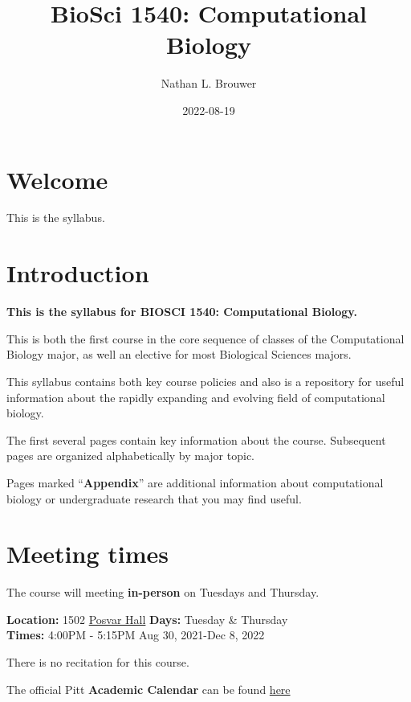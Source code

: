 \documentclass[
]{book}
\title{BioSci 1540: Computational Biology}
\author{Nathan L. Brouwer}
\date{2022-08-19}
\begin{document}
\maketitle

{
\setcounter{tocdepth}{1}
\tableofcontents
}
\hypertarget{welcome}{%
\chapter{Welcome}\label{welcome}}

This is the syllabus.

\hypertarget{intro}{%
\chapter{Introduction}\label{intro}}

\textbf{This is the syllabus for BIOSCI 1540: Computational Biology.}

This is both the first course in the core sequence of classes of the Computational Biology major, as well an elective for most Biological Sciences majors.

This syllabus contains both key course policies and also is a repository for useful information about the rapidly expanding and evolving field of computational biology.

The first several pages contain key information about the course. Subsequent pages are organized alphabetically by major topic.

Pages marked ``\textbf{Appendix}'' are additional information about computational biology or undergraduate research that you may find useful.

\hypertarget{meeting-times}{%
\chapter{Meeting times}\label{meeting-times}}

The course will meeting \textbf{in-person} on Tuesdays and Thursday.

\textbf{Location:} 1502 \href{https://www.tour.pitt.edu/tour/wesley-w-posvar-hall}{Posvar Hall}
\textbf{Days:} Tuesday \& Thursday\\
\textbf{Times:} 4:00PM - 5:15PM
Aug 30, 2021-Dec 8, 2022

There is no recitation for this course.

The official Pitt \textbf{Academic Calendar} can be found \href{https://www.registrar.pitt.edu/sites/default/files/pdf/Academic\%20Calendar\%202022-2023_Apple.pdf}{here}
\end{document}

